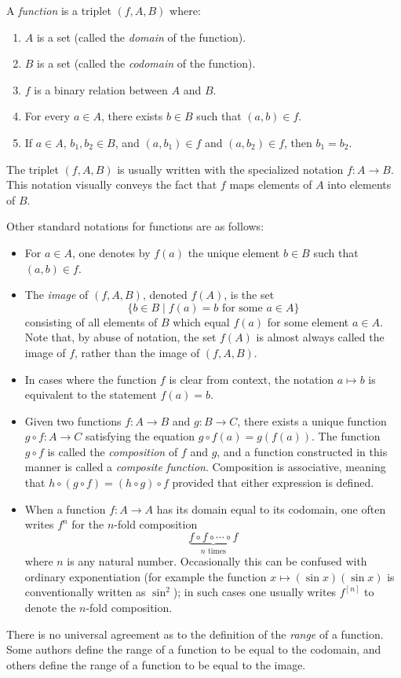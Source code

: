 \documentclass{article}
\begin{document}
A \emph{function} is a triplet $(f,A,B)$ where:
\begin{enumerate}
\item $A$ is a set (called the \emph{domain} of the function).
\item $B$ is a set (called the \emph{codomain} of the function).
\item $f$ is a binary relation between $A$ and $B$.
\item For every $a \in A$, there exists $b \in B$ such that $(a,b) \in f$.
\item If $a \in A$, $b_1,b_2 \in B$, and $(a,b_1) \in f$ and $(a,b_2) \in f$, then $b_1 = b_2$.
\end{enumerate}
The triplet $(f,A,B)$ is usually written with the specialized notation $f\colon A \to B$. This notation visually conveys the fact that $f$ maps elements of $A$ into elements of $B$.

Other standard notations for functions are as follows:
\begin{itemize}
\item For $a \in A$, one denotes by $f(a)$ the unique element $b \in B$ such that $(a,b) \in f$.
\item The \emph{image} of $(f,A,B)$, denoted $f(A)$, is the set
$$
\{b \in B \mid f(a) = b \text{ for some } a \in A\}
$$
consisting of all elements of $B$ which equal $f(a)$ for some element $a \in A$. Note that, by abuse of notation, the set $f(A)$ is almost always called the image of $f$, rather than the image of $(f,A,B)$.
\item In cases where the function $f$ is clear from context, the notation $a \mapsto b$ is equivalent to the statement $f(a) = b$.
\item Given two functions $f\colon A \to B$ and $g\colon B \to C$, there exists a unique function $g \circ f\colon A \to C$ satisfying the equation $g \circ f(a) = g(f(a))$. The function $g \circ f$ is called the \emph{composition} of $f$ and $g$, and a function constructed in this manner is called a \emph{composite function}. Composition is associative, meaning that $h \circ (g \circ f) = (h \circ g) \circ f$ provided that either expression is defined.
\item When a function $f\colon A \to A$ has its domain equal to its codomain, one often writes $f^n$ for the $n$-fold composition
$$
\underbrace{f \circ f \circ \cdots \circ f}_{n\text{ times}}
$$
where $n$ is any natural number.  Occasionally this can be confused with ordinary exponentiation (for example the function $x\mapsto (\sin x)(\sin x)$ is conventionally written as $\sin^2$); in such cases one usually writes $f^{[n]}$ to denote the $n$-fold composition.
\end{itemize}
There is no universal agreement as to the definition of the \emph{range} of a function. Some authors define the range of a function to be equal to the codomain, and others define the range of a function to be equal to the image.
\end{document}
